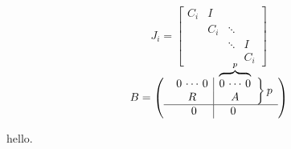 \documentclass{article}
\begin{document}
\[
  J_i =
  \begin{bmatrix}
    C_i & I \\
    & C_i & \ddots & \\
    & & \ddots& I \\
    & & & C_i
  \end{bmatrix}
\]

\[
  B=\left(
\begin{array}{c}
\left.\begin{array}{c|c}
0\,\cdots\, 0 & \smash{\overbrace{0\,\cdots\, 0\strut}^p}\\
R & A
\end{array}\right\}p\\  \hline
\begin{array}{c|c}
\hspace*{-1.3em}0\quad & \quad 0
\end{array}
\end{array}\right)
\]

hello.

\end{document}
